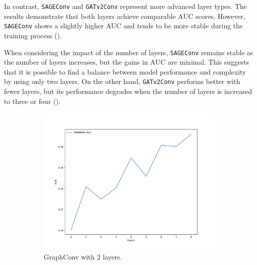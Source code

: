 \documentclass[11pt]{article}
\begin{document}
In contrast, \texttt{SAGEConv} and \texttt{GATv2Conv} represent more advanced layer types. 
%
The results demonstrate that both layers achieve comparable AUC scores. 
%
However, \texttt{SAGEConv} shows a slightly higher AUC and tends to be more stable during the training process ().

When considering the impact of the number of layers, \texttt{SAGEConv} remains stable as the number of 
%
layers increases, but the gains in AUC are minimal. 
%
This suggests that it is possible to find a balance between model performance and complexity by using only two layers. 
%
On the other hand, \texttt{GATv2Conv} performs better with fewer layers, but its performance degrades when the number 
%
of layers is increased to three or four ().


\begin{figure}
  \centering
  \begin{subfigure}{0.49\textwidth}
      \centering
      \includegraphics[width=\textwidth]{figures/charts/Graph/auc-layerType_GraphConv-numLayers_2.pdf}
      \caption{GraphConv with 2 layers.}
      \label{fig:graph2}
  \end{subfigure}
  \begin{subfigure}{0.49\textwidth}
    \centering

\end{subfigure}
\end{figure}
\end{document}
